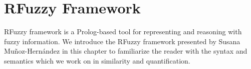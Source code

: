 \documentclass[Thesis.tex]{subfiles}
\begin{document}
\chapter{RFuzzy Framework}
\label{chap:RFuzzyFramework}
RFuzzy framework is a Prolog-based tool for representing and reasoning with fuzzy information. We introduce the RFuzzy framework presented by Susana Mu\~noz-Hern\'andez \cite{MPS10} in this chapter to familiarize the reader with the syntax and semantics which we work on in similarity and quantification. 




\end{document}
